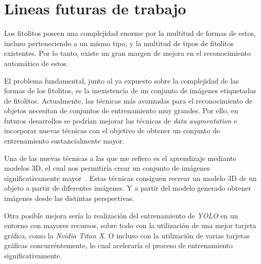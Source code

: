 \section{Lineas futuras de trabajo}

Los fitolitos poseen una complejidad enorme por la multitud de formas de estos, incluso perteneciendo a un mismo tipo, y la multitud de tipos de fitolitos existentes. Por lo tanto, existe un gran margen de mejora en el reconocimiento automático de estos.

El problema fundamental, junto al ya expuesto sobre la complejidad de las formas de los fitolitos, es la inexistencia de un conjunto de imágenes etiquetadas de fitolitos. Actualmente, las técnicas más avanzadas para el reconocimiento de objetos necesitan de conjuntos de entrenamiento muy grandes. Por ello, en futuros desarrollos se podrían mejorar las técnicas de \textit{data augmentation} e incorporar nuevas técnicas con el objetivo de obtener un conjunto de entrenamiento sustancialmente mayor.

Una de las nuevas técnicas a las que me refiero es el aprendizaje mediante modelos 3D, el cual nos permitiría crear un conjunto de imágenes significativamente mayor~\cite{sem,3dmodels}. Estas técnicas consiguen recrear un modelo 3D de un objeto a partir de diferentes imágenes. Y a partir del modelo generado obtener imágenes desde las distintas perspectivas.

Otra posible mejora sería la realización del entrenamiento de \textit{YOLO} en un entorno con mayores recursos, sobre todo con la utilización de una mejor tarjeta gráfica, como la \textit{Nvidia Titan X}. O incluso con la utilización de varias tarjetas gráficas concurréntemente, lo cual aceleraría el proceso de entrenamiento significativamente.